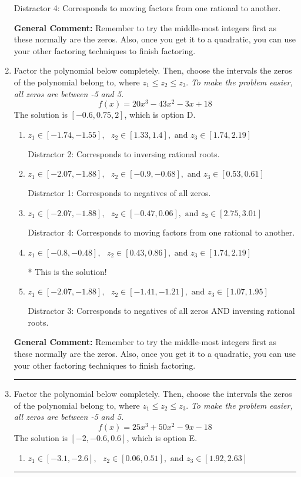 \documentclass{extbook}[14pt]
\newcommand{\litem}[1]{\item #1

\rule{\textwidth}{0.4pt}}
\begin{document}
\begin{enumerate}
{\begin{enumerate}[label=\Alph*.]
 Distractor 4: Corresponds to moving factors from one rational to another.
\end{enumerate}

\textbf{General Comment:} Remember to try the middle-most integers first as these normally are the zeros. Also, once you get it to a quadratic, you can use your other factoring techniques to finish factoring.
}
\litem{
Factor the polynomial below completely. Then, choose the intervals the zeros of the polynomial belong to, where $z_1 \leq z_2 \leq z_3$. \textit{To make the problem easier, all zeros are between -5 and 5.}
\[ f(x) = 20x^{3} -43 x^{2} -3 x + 18 \]The solution is \( [-0.6, 0.75, 2] \), which is option D.\begin{enumerate}[label=\Alph*.]
\item \( z_1 \in [-1.74, -1.55], \text{   }  z_2 \in [1.33, 1.4], \text{   and   } z_3 \in [1.74, 2.19] \)

 Distractor 2: Corresponds to inversing rational roots.
\item \( z_1 \in [-2.07, -1.88], \text{   }  z_2 \in [-0.9, -0.68], \text{   and   } z_3 \in [0.53, 0.61] \)

 Distractor 1: Corresponds to negatives of all zeros.
\item \( z_1 \in [-2.07, -1.88], \text{   }  z_2 \in [-0.47, 0.06], \text{   and   } z_3 \in [2.75, 3.01] \)

 Distractor 4: Corresponds to moving factors from one rational to another.
\item \( z_1 \in [-0.8, -0.48], \text{   }  z_2 \in [0.43, 0.86], \text{   and   } z_3 \in [1.74, 2.19] \)

* This is the solution!
\item \( z_1 \in [-2.07, -1.88], \text{   }  z_2 \in [-1.41, -1.21], \text{   and   } z_3 \in [1.07, 1.95] \)

 Distractor 3: Corresponds to negatives of all zeros AND inversing rational roots.
\end{enumerate}

\textbf{General Comment:} Remember to try the middle-most integers first as these normally are the zeros. Also, once you get it to a quadratic, you can use your other factoring techniques to finish factoring.
}
\litem{
Factor the polynomial below completely. Then, choose the intervals the zeros of the polynomial belong to, where $z_1 \leq z_2 \leq z_3$. \textit{To make the problem easier, all zeros are between -5 and 5.}
\[ f(x) = 25x^{3} +50 x^{2} -9 x -18 \]The solution is \( [-2, -0.6, 0.6] \), which is option E.\begin{enumerate}[label=\Alph*.]
\item \( z_1 \in [-3.1, -2.6], \text{   }  z_2 \in [0.06, 0.51], \text{   and   } z_3 \in [1.92, 2.63] \)


\end{enumerate}}
\end{enumerate}
\end{document}
